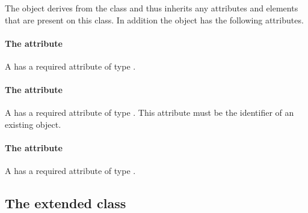 


The \CompartmentMapping object derives from the \SBase class and thus
inherits any attributes and elements that are present on this class.
In addition the \CompartmentMapping object has the following attributes.

\paragraph{The \fixttspace{} attribute}

A \CompartmentMapping has a required attribute  of type
.


\paragraph{The \fixttspace{} attribute}

A \CompartmentMapping has a required attribute  of
type .
This attribute must be the identifier of an existing \DomainType object.


\paragraph{The \fixttspace{} attribute}

A \CompartmentMapping has a required attribute  of type
.


\subsection{The extended  class}
\label{extended-species-class}



